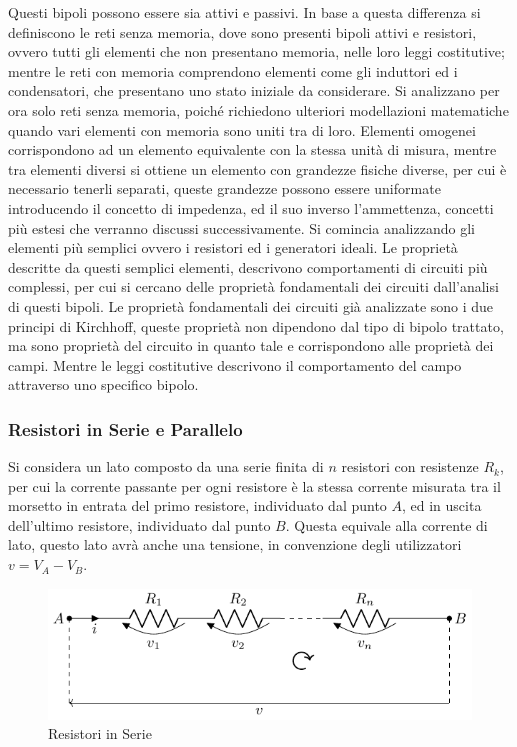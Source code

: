 \documentclass{article}
\numberwithin{equation}{subsection}
\begin{document}
Questi bipoli possono essere sia attivi e passivi. In base a questa differenza si definiscono le reti senza memoria, dove sono presenti bipoli attivi e resistori, ovvero tutti 
gli elementi che non presentano memoria, nelle loro leggi costitutive; mentre le reti con memoria comprendono elementi come gli induttori ed i condensatori, che presentano 
uno stato iniziale da considerare. Si analizzano per ora solo reti senza memoria, poiché richiedono ulteriori modellazioni matematiche 
quando vari elementi con memoria sono uniti tra di loro. Elementi omogenei corrispondono ad un elemento equivalente con la stessa unità di misura, mentre tra elementi diversi 
si ottiene un elemento con grandezze fisiche diverse, per cui è necessario tenerli separati, queste grandezze possono essere uniformate introducendo il concetto di impedenza, 
ed il suo inverso l'ammettenza, concetti più estesi che verranno discussi successivamente. Si comincia analizzando gli elementi più semplici ovvero i resistori ed i generatori 
ideali. Le proprietà descritte da questi semplici elementi, descrivono comportamenti di circuiti più complessi, per cui si cercano delle proprietà fondamentali dei circuiti 
dall'analisi di questi bipoli. Le proprietà fondamentali dei circuiti già analizzate sono i due principi di Kirchhoff, queste proprietà non dipendono dal tipo di bipolo trattato, 
ma sono proprietà del circuito in quanto tale e corrispondono alle proprietà dei campi. Mentre le leggi costitutive descrivono il comportamento del campo attraverso uno 
specifico bipolo.   

\subsubsection{Resistori in Serie e Parallelo}

Si considera un lato composto da una serie finita di $n$ resistori con resistenze $R_k$, per cui la corrente passante per ogni resistore è la stessa corrente misurata tra il 
morsetto in entrata del primo resistore, individuato dal punto $A$, ed in uscita dell'ultimo resistore, individuato dal punto $B$. Questa equivale alla corrente di lato, 
questo lato avrà anche una tensione, in convenzione degli utilizzatori $v=V_A-V_B$. 
\begin{figure}[H]%
    \centering
    \includegraphics{resistori-serie.pdf}%
    \caption{Resistori in Serie}%
    \label{fig:resistori-serie}
\end{figure}
\end{document}
